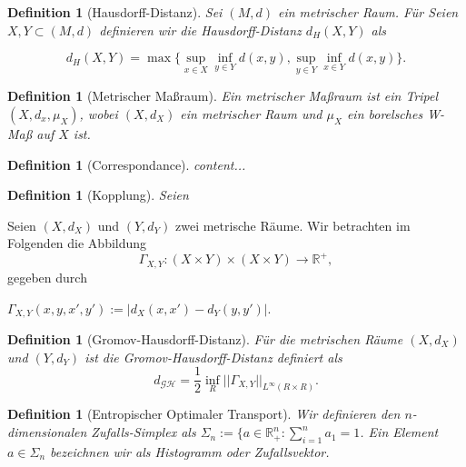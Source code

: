 \documentclass[twoside, 11pt,a4paper]{article}
\def\emph#1{\textit{#1}}
\newtheorem{definition}[theorem]{Definition}
\numberwithin{equation}{section}
\begin{document}
	\begin{definition}[Hausdorff-Distanz]
		Sei $(M,d)$ ein metrischer Raum.
		Für 
		Seien $X,Y \subset (M,d)$ definieren wir die \emph{Hausdorff-Distanz} $d_H(X,Y)$ als
		
		\begin{equation}
			d_H(X,Y) = \max \lbrace \sup_{x \in X} \inf_{y \in Y} d(x,y), \sup_{y \in Y} \inf_{x \in Y} d(x,y) \rbrace .
		\end{equation} 
		
	\end{definition}

	\begin{definition}[Metrischer Maßraum]
	Ein \emph{metrischer Maßraum} ist ein Tripel $(X,d_x,\mu_X)$, wobei $(X,d_X)$ ein metrischer Raum und $\mu_X$ ein borelsches W-Maß auf $X$ ist.
	\end{definition}

	\begin{definition}[Correspondance]
		content...
	\end{definition}

	\begin{definition}[Kopplung]
	Seien 
	\end{definition}
	
	Seien $(X,d_X)$ und $(Y,d_Y)$ zwei metrische Räume. Wir betrachten im Folgenden die Abbildung
	\begin{equation}
		\Gamma_{X,Y}: (X\times Y) \times (X \times Y) \to \mathbb{R^{+}},
	\end{equation}
	gegeben durch
	
	$\Gamma_{X,Y}(x,y,x',y'):= |d_X(x,x') - d_Y(y,y')|$.
	
	\begin{definition}[Gromov-Hausdorff-Distanz]
	Für die metrischen Räume $(X,d_X)$ und $(Y,d_Y)$ ist die \emph{Gromov-Hausdorff-Distanz} definiert als
	\begin{equation}
		d_{\mathcal{G}\mathcal{H}} = \frac{1}{2}\inf_{R}||\Gamma_{X,Y}||_{L^\infty(R \times R)}.
	\end{equation}
	\end{definition}
	\begin{definition}[Entropischer Optimaler Transport]
		Wir definieren den $n$-dimensionalen Zufalls-Simplex als $\Sigma_n := \lbrace a \in \mathbb{R}_+^n: \sum_{i=1}^{n}{a_1} = 1$. Ein Element $a \in \Sigma_n$ bezeichnen wir als Histogramm oder Zufallsvektor.
		
	\end{definition}
\end{document}
